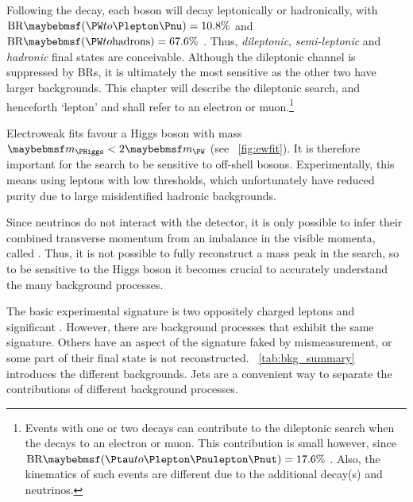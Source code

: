 
Following the \HWW decay, each \PW boson will decay leptonically or hadronically, with 
$\text{BR}\parenths{\HepProcess{\PW\HepTo\Plepton\Pnu}} = 10.8\%$ and 
$\text{BR}\parenths{\HepProcess{\PW\HepTo \text{hadrons}}} = 67.6\%$ \cite{PDG:2012}. 
Thus, \textit{dileptonic}, \textit{semi-leptonic} and \textit{hadronic} final states are 
conceivable. Although the dileptonic channel is suppressed by BRs, it is ultimately 
the most sensitive as the other two have larger backgrounds. This chapter 
will describe the dileptonic search, and henceforth 
`lepton' and \Plepton shall refer to an electron or muon.\footnote{
	Events with one or two \HepProcess{\PW\HepTo\Ptau\Pnu} decays can 
	contribute to the dileptonic search when the \Ptau decays to an electron or muon. This 
	contribution is small however, since
	$\text{BR}\parenths{\HepProcess{\Ptau\HepTo\Plepton\Pnulepton\Pnut}} = 17.6\%$ 
	\cite{PDG:2012}. Also, the kinematics of such events are different due to the 
	additional decay(s) and neutrinos.
}

Electroweak fits favour a Higgs boson with mass $\mH < 2\mW$ (see \Figure~\ref{fig:ewfit}).
It is therefore important for the \HWW search to be sensitive to off-shell \PW bosons. 
Experimentally, this means using leptons with low \pt thresholds, which unfortunately 
have reduced purity due to large misidentified hadronic backgrounds.

Since neutrinos do not interact with the detector, it is only possible to infer their 
combined transverse momentum from an imbalance in the visible momenta, called \met. 
Thus, it is not possible to fully reconstruct a 
mass peak in the \HWWlvlv search, so to be sensitive to the Higgs boson it becomes 
crucial to accurately understand the many background processes.

The basic experimental signature is two oppositely charged leptons and significant \met. 
However, there are background processes that exhibit the same signature. Others have an 
aspect of the signature faked by mismeasurement, or some part of their final state is not 
reconstructed. \Table~\ref{tab:bkg_summary} introduces the different backgrounds. Jets 
are a convenient way to separate the contributions of different background processes.

